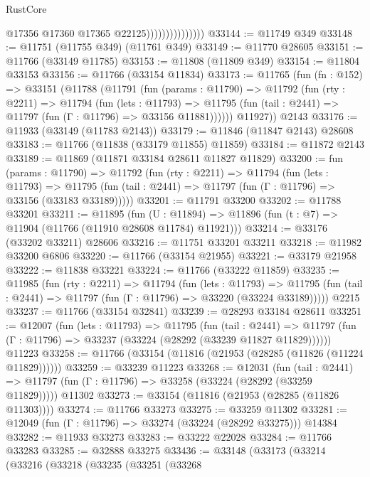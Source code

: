 \begin{lexlean}{RustCore}
\begin{coremodule}
                                  @17356
                                  @17360
                                  @17365
                                  @22125)))))))))))))))
@33144 := @11749 @349
@33148 := @11751 (@11755 @349) (@11761 @349)
@33149 := @11770 @28605
@33151 := @11766 (@33149 @11785)
@33153 := @11808 (@11809 @349)
@33154 := @11804 @33153
@33156 := @11766 (@33154 @11834)
@33173 := @11765
    (fun (fn : @152) =>
    @33151
      (@11788
        (@11791
          (fun (params : @11790) =>
          @11792
            (fun (rty : @2211) =>
            @11794
              (fun (lets : @11793) =>
              @11795 (fun (tail : @2441) => @11797 (fun (Γ : @11796) => @33156 @11881))))))
        @11927))
    @2143
@33176 := @11933 (@33149 (@11783 @2143))
@33179 := @11846 (@11847 @2143) @28608
@33183 := @11766 (@11838 (@33179 @11855) @11859)
@33184 := @11872 @2143
@33189 := @11869 (@11871 @33184 @28611 @11827 @11829)
@33200 := fun (params : @11790) =>
  @11792
    (fun (rty : @2211) =>
    @11794
      (fun (lets : @11793) =>
      @11795 (fun (tail : @2441) => @11797 (fun (Γ : @11796) => @33156 (@33183 @33189)))))
@33201 := @11791 @33200
@33202 := @11788 @33201
@33211 := @11895
    (fun (U : @11894) => @11896 (fun (t : @7) => @11904 (@11766 (@11910 @28608 @11784) @11921)))
@33214 := @33176 (@33202 @33211) @28606
@33216 := @11751 @33201 @33211
@33218 := @11982 @33200 @6806
@33220 := @11766 (@33154 @21955)
@33221 := @33179 @21958
@33222 := @11838 @33221
@33224 := @11766 (@33222 @11859)
@33235 := @11985
    (fun (rty : @2211) =>
    @11794
      (fun (lets : @11793) =>
      @11795 (fun (tail : @2441) => @11797 (fun (Γ : @11796) => @33220 (@33224 @33189)))))
    @2215
@33237 := @11766 (@33154 @32841)
@33239 := @28293 @33184 @28611
@33251 := @12007
    (fun (lets : @11793) =>
    @11795
      (fun (tail : @2441) =>
      @11797 (fun (Γ : @11796) => @33237 (@33224 (@28292 (@33239 @11827 @11829))))))
    @11223
@33258 := @11766 (@33154 (@11816 (@21953 (@28285 (@11826 (@11224 @11829))))))
@33259 := @33239 @11223
@33268 := @12031
    (fun (tail : @2441) => @11797 (fun (Γ : @11796) => @33258 (@33224 (@28292 (@33259 @11829)))))
    @11302
@33273 := @33154 (@11816 (@21953 (@28285 (@11826 @11303))))
@33274 := @11766 @33273
@33275 := @33259 @11302
@33281 := @12049 (fun (Γ : @11796) => @33274 (@33224 (@28292 @33275))) @14384
@33282 := @11933 @33273
@33283 := @33222 @22028
@33284 := @11766 @33283
@33285 := @32888 @33275
@33436 := @33148
    (@33173
      (@33214
        (@33216
          (@33218
            (@33235
              (@33251
                (@33268

\end{coremodule}
\end{lexlean}
